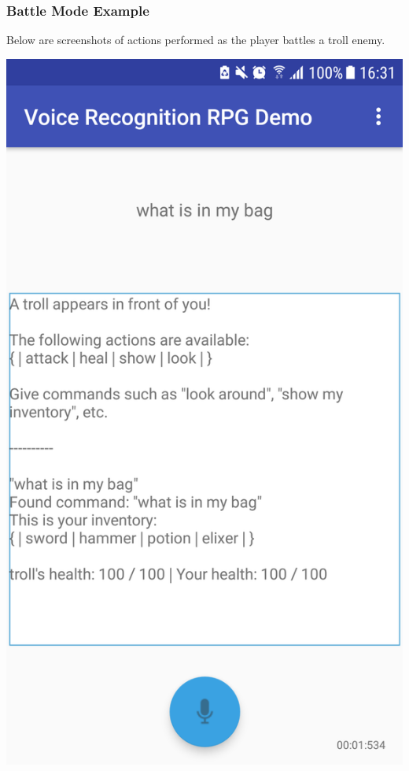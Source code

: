 \documentclass[11pt]{article}
\begin{document}
\subsubsection{Battle Mode Example}
\label{appendix:battle-mode-screenshots}
Below are screenshots of actions performed as the player battles a troll enemy.

\begin{center}
\includegraphics[scale=0.18]{battle-1.png}

\end{center}
\end{document}
